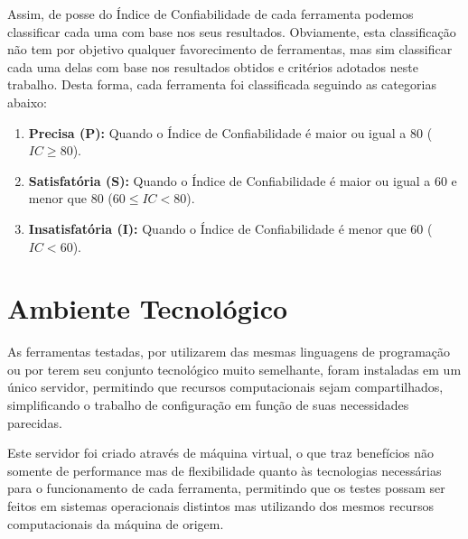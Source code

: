 Assim, de posse do Índice de Confiabilidade de cada ferramenta podemos classificar cada uma com base nos seus resultados. 
Obviamente, esta classificação não tem por objetivo qualquer favorecimento de ferramentas, mas sim classificar cada uma delas com base nos resultados obtidos e critérios adotados neste trabalho. Desta forma, cada ferramenta foi classificada seguindo as categorias abaixo:

\begin{enumerate}
    \item \textbf{Precisa (P):} Quando o Índice de Confiabilidade é maior ou igual a 80 ($IC\geq80$).
    \item \textbf{Satisfatória (S):} Quando o Índice de Confiabilidade é maior ou igual a 60 e menor que 80 ($60 \leq IC < 80$).
    \item \textbf{Insatisfatória (I):} Quando o Índice de Confiabilidade é menor que 60 ($IC < 60$).
\end{enumerate}

\section{Ambiente Tecnológico}
\label{sec:tech-environment}

As ferramentas testadas, por utilizarem das mesmas linguagens de programação ou por terem seu conjunto tecnológico muito semelhante, foram instaladas em um único servidor, permitindo que recursos computacionais sejam compartilhados, simplificando o trabalho de configuração em função de suas necessidades parecidas.

Este servidor foi criado através de máquina virtual, o que traz benefícios não somente de performance mas de flexibilidade quanto às tecnologias necessárias para o funcionamento de cada ferramenta, permitindo que os testes possam ser feitos em sistemas operacionais distintos mas utilizando dos mesmos recursos computacionais da máquina de origem.


